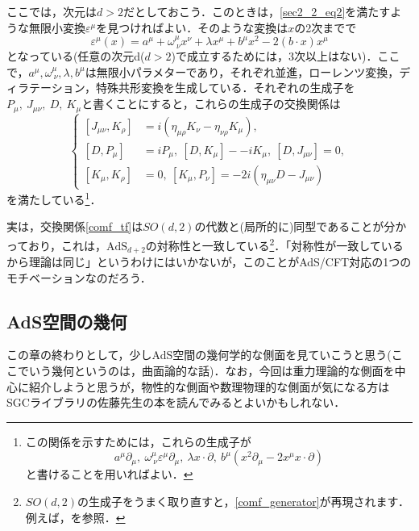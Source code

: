 \documentclass[a4paper,uplatex,dvipdfmx]{jsarticle}
\theoremstyle{definition}
\begin{document}
ここでは，次元は$d>2$だとしておこう．このときは，\eqref{sec2_2_eq2}を満たすような無限小変換$\varepsilon^{\mu}$を見つければよい．そのような変換は$x$の2次までで
\begin{equation}
  \varepsilon^{\mu}(x)
  =
  a^{\mu}
  +
  \omega^{\mu}_{\ \nu}x^{\nu}
  +
  \lambda x^{\mu}
  +
  b^{\mu}x^2
  -
  2(b\cdot x)x^{\mu}
\end{equation}
となっている(任意の次元d($d>2$)で成立するためには，3次以上はない)．ここで，$a^{\mu}, \omega^{\mu}_{\ \nu}, \lambda, b^{\mu}$は無限小パラメターであり，それぞれ並進，ローレンツ変換，ディラテーション，特殊共形変換を生成している．それぞれの生成子を$P_{\mu},\ J_{\mu\nu},\ D,\ K_{\mu}$と書くことにすると，これらの生成子の交換関係は
\begin{equation}
  \left\{
    \begin{alignedat}{1}
      [J_{\mu\nu},K_{\rho}]
      &=
      i(\eta_{\mu\rho}K_{\nu}-\eta_{\nu\rho}K_{\mu})
      ,
      \\
      [D,P_{\mu}]
      &=
      iP_{\mu}
      ,\ 
      [D,K_{\mu}]
      -
      -iK_{\mu}
      ,\ 
      [D,J_{\mu\nu}]
      =
      0
      ,
      \\
      [K_{\mu},K_{\rho}]
      &=
      0
      ,\ 
      [K_{\mu},P_{\nu}]
      =
      -2i(\eta_{\mu\nu}D-J_{\mu\nu})
    \end{alignedat}
  \right.
  \label{comf_generator}
\end{equation}
を満たしている\footnote{
  この関係を示すためには，これらの生成子が
  \begin{equation}
    a^{\mu}\partial_{\mu},\ 
    \omega^{\mu}_{\ \nu}\varepsilon^{\mu}\partial_{\mu},\ 
    \lambda x\cdot\partial,\ 
    b^{\mu}(x^2 \partial_{\mu}-2x^{\mu}x\cdot\partial)
    \nonumber
  \end{equation}
  と書けることを用いればよい．
}．

実は，交換関係\eqref{comf_tf}は$SO(d,2)$の代数と(局所的に)同型であることが分かっており，これは，$\text{AdS}_{d+2}$の対称性と一致している\footnote{
  $SO(d,2)$の生成子をうまく取り直すと，\eqref{comf_generator}が再現されます．例えば，\cite{Ammon_GaugeGravity_2015}を参照．
}．「対称性が一致しているから理論は同じ」というわけにはいかないが，このことがAdS/CFT対応の1つのモチベーションなのだろう．


\subsection{AdS空間の幾何}

この章の終わりとして，少しAdS空間の幾何学的な側面を見ていこうと思う(ここでいう幾何というのは，曲面論的な話)．なお，今回は重力理論的な側面を中心に紹介しようと思うが，物性的な側面や数理物理的な側面が気になる方はSGCライブラリの佐藤先生の本\cite{佐藤_弦理_2021}を読んでみるとよいかもしれない．
\end{document}
